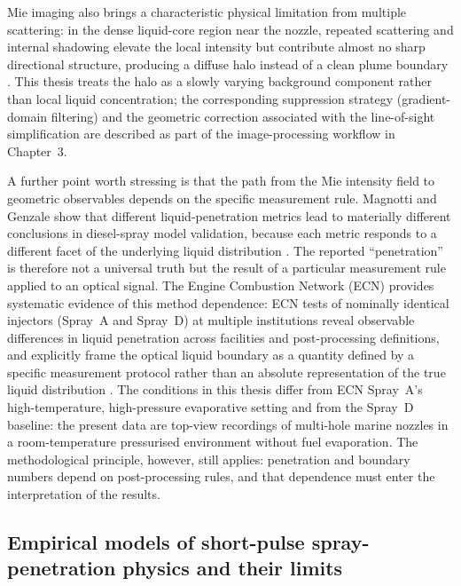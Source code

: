\documentclass[english, 12pt, a4paper, elec, utf8, a-2b, online]{aaltothesis}
\begin{document}
Mie imaging also brings a characteristic physical limitation from multiple scattering:
in the dense liquid-core region near the nozzle, repeated scattering and internal shadowing elevate the local intensity but contribute almost no sharp directional structure, producing a diffuse halo instead of a clean plume boundary \cite{BohrenHuffman2004,Linne2013SprayImaging}.
This thesis treats the halo as a slowly varying background component rather than local liquid concentration; the corresponding suppression strategy (gradient-domain filtering) and the geometric correction associated with the line-of-sight simplification are described as part of the image-processing workflow in Chapter~3.

A further point worth stressing is that the path from the Mie intensity field to geometric observables depends on the specific measurement rule.
Magnotti and Genzale show that different liquid-penetration metrics lead to materially different conclusions in diesel-spray model validation,
because each metric responds to a different facet of the underlying liquid distribution \cite{MagnottiGenzale2013}.
The reported ``penetration'' is therefore not a universal truth but the result of a particular measurement rule applied to an optical signal.
The Engine Combustion Network (ECN) provides systematic evidence of this method dependence:
ECN tests of nominally identical injectors (Spray~A and Spray~D) at multiple institutions reveal observable differences in liquid penetration across facilities and post-processing definitions,
and explicitly frame the optical liquid boundary as a quantity defined by a specific measurement protocol rather than an absolute representation of the true liquid distribution
\cite{ecn_liquid_penetration,ecn_liquid_penetration_accessory,MeijerECN2012}.
The conditions in this thesis differ from ECN Spray~A's high-temperature, high-pressure evaporative setting and from the Spray~D baseline:
the present data are top-view recordings of multi-hole marine nozzles in a room-temperature pressurised environment without fuel evaporation.
The methodological principle, however, still applies:
penetration and boundary numbers depend on post-processing rules, and that dependence must enter the interpretation of the results.

\subsection{Empirical models of short-pulse spray-penetration physics and their limits}
\end{document}
